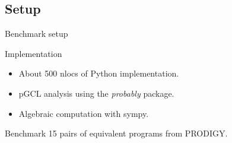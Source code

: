 \documentclass[8pt]{beamer}
\begin{document}
\subsection{Setup}
\begin{frame}{Benchmark setup}
	\begin{block}{Implementation}
		\begin{itemize}
			\item About 500 nlocs of Python implementation.
			\item pGCL analysis using the \emph{probably} package\cite{probably}.
			\item Algebraic computation with sympy\cite{sympy}.
		\end{itemize}
	\end{block}
	\begin{block}{Benchmark}
		15 pairs of equivalent programs from PRODIGY\cite{cav-pgf}.
	\end{block}
\end{frame}
\end{document}
